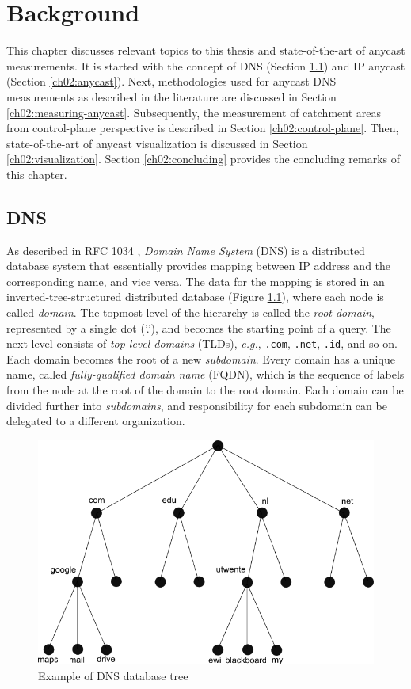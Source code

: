\chapter{Background}
\label{ch02}
This chapter discusses relevant topics to this thesis and state-of-the-art of anycast measurements. It is started with the concept of DNS (Section \ref{ch02:dns}) and IP anycast (Section \ref{ch02:anycast}). Next, methodologies used for anycast DNS measurements as described in the literature are discussed in Section \ref{ch02:measuring-anycast}. Subsequently, the measurement of catchment areas from control-plane perspective is described in Section \ref{ch02:control-plane}. Then, state-of-the-art of anycast visualization is discussed in Section \ref{ch02:visualization}. Section \ref{ch02:concluding} provides the concluding remarks of this chapter.

\section{DNS}
\label{ch02:dns}
As described in RFC 1034 \cite{rfc1034}, \textit{Domain Name System} (DNS) is a distributed database system that essentially provides mapping between IP address and the corresponding name, and vice versa. The data for the mapping is stored in an inverted-tree-structured distributed database (Figure \ref{fig:dns-tree}), where each node is called \textit{domain}. The topmost level of the hierarchy is called the \textit{root domain}, represented by a single dot ('.'), and becomes the starting point of a query. The next level consists of \textit{top-level domains} (TLDs), \textit{e.g.}, \texttt{.com}, \texttt{.net}, \texttt{.id}, and so on. Each domain becomes the root of  a new \textit{subdomain}. Every domain has a unique name, called \textit{fully-qualified domain name} (FQDN), which is the sequence of labels from the node at the root of the domain to the root domain. Each domain can be divided further into \textit{subdomains}, and responsibility for each subdomain can be delegated to a different organization.

\begin{figure}
	\centering
	\includegraphics[scale=0.45]{img/dns-tree.png}
	\caption{Example of DNS database tree}
	\label{fig:dns-tree}
\end{figure}

